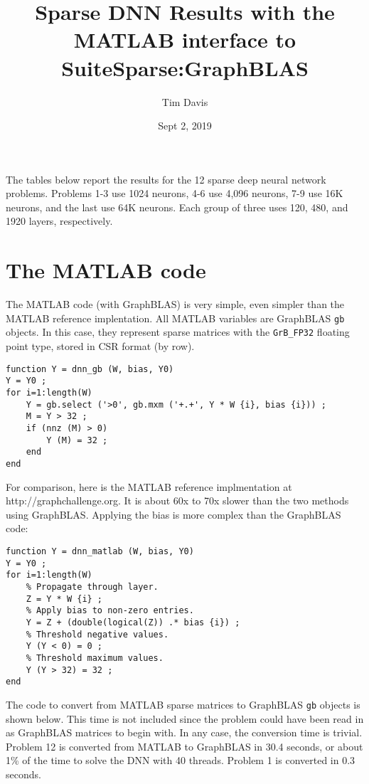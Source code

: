 \documentclass[12pt]{article}
\title{Sparse DNN Results with the MATLAB interface to SuiteSparse:GraphBLAS}
\author{Tim Davis}
\date{Sept 2, 2019}
\begin{document}
\maketitle

The tables below report the results for the 12 sparse deep neural network problems.
Problems 1-3 use 1024 neurons, 4-6 use 4,096 neurons, 7-9 use 16K neurons, and the
last use 64K neurons.  Each group of three uses 120, 480, and 1920 layers,
respectively.

\section{The MATLAB code}

The MATLAB code (with GraphBLAS) is very simple, even simpler than the MATLAB
reference implentation.  All MATLAB variables are GraphBLAS \verb'gb' objects.
In this case, they represent sparse matrices with the \verb'GrB_FP32' floating
point type, stored in CSR format (by row).

{\footnotesize
\begin{verbatim}
function Y = dnn_gb (W, bias, Y0)
Y = Y0 ;
for i=1:length(W)
    Y = gb.select ('>0', gb.mxm ('+.+', Y * W {i}, bias {i})) ;
    M = Y > 32 ;
    if (nnz (M) > 0)
        Y (M) = 32 ;
    end
end
\end{verbatim}}

For comparison, here is the MATLAB reference implmentation at \newline
http://graphchallenge.org.  It is about 60x to 70x slower than the two methods
using GraphBLAS.  Applying the bias is more complex than the GraphBLAS code:

{\footnotesize
\begin{verbatim}
function Y = dnn_matlab (W, bias, Y0)
Y = Y0 ;
for i=1:length(W)
    % Propagate through layer.
    Z = Y * W {i} ;
    % Apply bias to non-zero entries.
    Y = Z + (double(logical(Z)) .* bias {i}) ;
    % Threshold negative values.
    Y (Y < 0) = 0 ;
    % Threshold maximum values.
    Y (Y > 32) = 32 ;
end
\end{verbatim}}

The code to convert from MATLAB sparse matrices to GraphBLAS \verb'gb' objects
is shown below.  This time is not included since the problem could have been
read in as GraphBLAS matrices to begin with.  In any case, the conversion time
is trivial.  Problem 12 is converted from MATLAB to GraphBLAS in 30.4 seconds,
or about 1\% of the time to solve the DNN with 40 threads.  Problem 1 is
converted in 0.3 seconds.
\end{document}
